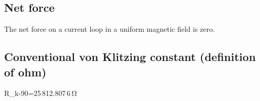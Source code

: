 \documentclass[\mainfilename]{subfiles}
\begin{document}
\begin{sectionBox}
    \subsection{Net force}
    The net force on a current loop in a uniform magnetic field is zero.



    \subsection{Conventional von Klitzing constant (definition of ohm)}
    \begin{BM}
        R_{k-90}=25\,812.807\,6\,\unit{\ohm} 
    \end{BM}

\end{sectionBox}
\end{document}
